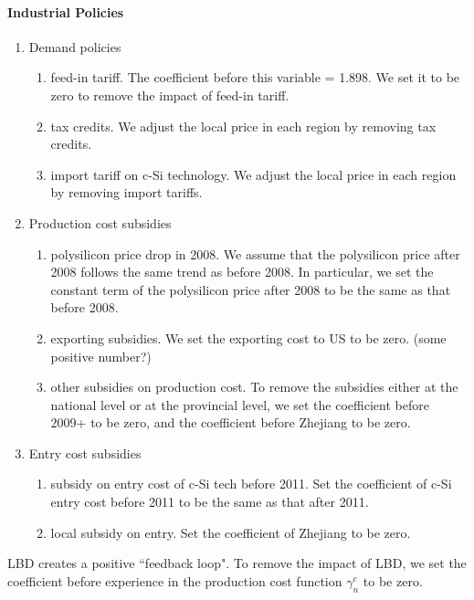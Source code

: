 \documentclass[12pt, letter]{article}
\begin{document}
\paragraph{Industrial Policies}

\begin{enumerate}
    \item Demand policies
        \begin{enumerate}
            \item feed-in tariff. The coefficient before this variable = 1.898. We set it to be zero to remove the impact of feed-in tariff.
            \item tax credits. We adjust the local price in each region by removing tax credits. 
            \item import tariff on c-Si technology. We adjust the local price in each region by removing import tariffs.
        \end{enumerate}
    \item Production cost subsidies
        \begin{enumerate}
            \item polysilicon price drop in 2008.  We assume that the polysilicon price after 2008 follows the same trend as before 2008. In particular, we set the constant term of the polysilicon price after 2008 to be the same as that before 2008.
            \item exporting subsidies. We set the exporting cost to US to be zero. (some positive number?)
            \item other subsidies on production cost. To remove the subsidies either at the national level or at the provincial level, we set the coefficient before 2009+ to be zero, and the coefficient before Zhejiang to be zero.
        \end{enumerate}
     \item Entry cost subsidies
        \begin{enumerate}
            \item subsidy on entry cost of c-Si tech before 2011. Set the coefficient of c-Si entry cost before 2011 to be the same as that after 2011.
            \item local subsidy on entry. Set the coefficient of Zhejiang to be zero.
        \end{enumerate}
\end{enumerate}

LBD creates a positive ``feedback loop".
To remove the impact of LBD, we set the coefficient before experience in the production cost function $\gamma_n^e$ to be zero.
\end{document}
